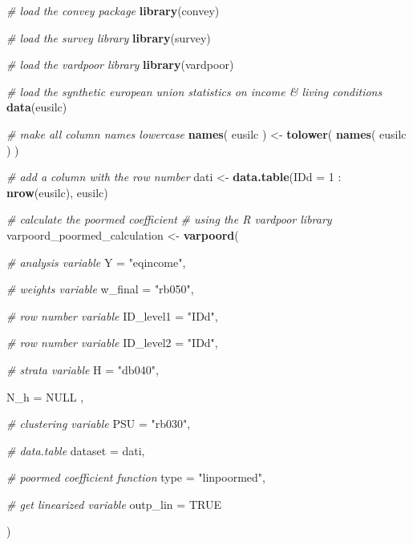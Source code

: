 \documentclass[]{book}
\newenvironment{Shaded}{\begin{snugshade}}{\end{snugshade}}
\newcommand{\KeywordTok}[1]{\textcolor[rgb]{0.13,0.29,0.53}{\textbf{{#1}}}}
\newcommand{\DataTypeTok}[1]{\textcolor[rgb]{0.13,0.29,0.53}{{#1}}}
\newcommand{\DecValTok}[1]{\textcolor[rgb]{0.00,0.00,0.81}{{#1}}}
\newcommand{\StringTok}[1]{\textcolor[rgb]{0.31,0.60,0.02}{{#1}}}
\newcommand{\CommentTok}[1]{\textcolor[rgb]{0.56,0.35,0.01}{\textit{{#1}}}}
\newcommand{\OtherTok}[1]{\textcolor[rgb]{0.56,0.35,0.01}{{#1}}}
\newcommand{\NormalTok}[1]{{#1}}
\theoremstyle{definition}
\theoremstyle{definition}
\theoremstyle{remark}
\begin{document}
\begin{Shaded}
\begin{Highlighting}[]
\CommentTok{# load the convey package}
\KeywordTok{library}\NormalTok{(convey)}

\CommentTok{# load the survey library}
\KeywordTok{library}\NormalTok{(survey)}

\CommentTok{# load the vardpoor library}
\KeywordTok{library}\NormalTok{(vardpoor)}

\CommentTok{# load the synthetic european union statistics on income & living conditions}
\KeywordTok{data}\NormalTok{(eusilc)}

\CommentTok{# make all column names lowercase}
\KeywordTok{names}\NormalTok{( eusilc ) <-}\StringTok{ }\KeywordTok{tolower}\NormalTok{( }\KeywordTok{names}\NormalTok{( eusilc ) )}

\CommentTok{# add a column with the row number}
\NormalTok{dati <-}\StringTok{ }\KeywordTok{data.table}\NormalTok{(}\DataTypeTok{IDd =} \DecValTok{1} \NormalTok{:}\StringTok{ }\KeywordTok{nrow}\NormalTok{(eusilc), eusilc)}

\CommentTok{# calculate the poormed coefficient}
\CommentTok{# using the R vardpoor library}
\NormalTok{varpoord_poormed_calculation <-}
\StringTok{    }\KeywordTok{varpoord}\NormalTok{(}
    
        \CommentTok{# analysis variable}
        \DataTypeTok{Y =} \StringTok{"eqincome"}\NormalTok{, }
        
        \CommentTok{# weights variable}
        \DataTypeTok{w_final =} \StringTok{"rb050"}\NormalTok{,}
        
        \CommentTok{# row number variable}
        \DataTypeTok{ID_level1 =} \StringTok{"IDd"}\NormalTok{,}

        \CommentTok{# row number variable}
        \DataTypeTok{ID_level2 =} \StringTok{"IDd"}\NormalTok{,}
                
        \CommentTok{# strata variable}
        \DataTypeTok{H =} \StringTok{"db040"}\NormalTok{, }
        
        \DataTypeTok{N_h =} \OtherTok{NULL} \NormalTok{,}
        
        \CommentTok{# clustering variable}
        \DataTypeTok{PSU =} \StringTok{"rb030"}\NormalTok{, }
        
        \CommentTok{# data.table}
        \DataTypeTok{dataset =} \NormalTok{dati, }
        
        \CommentTok{# poormed coefficient function}
        \DataTypeTok{type =} \StringTok{"linpoormed"}\NormalTok{,}
      
      \CommentTok{# get linearized variable}
      \DataTypeTok{outp_lin =} \OtherTok{TRUE}
        
    \NormalTok{)}
\end{Highlighting}
\end{Shaded}
\end{document}
